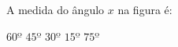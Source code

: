 A medida do \^angulo $x$ na figura \'e:

\parbox{0.25\linewidth}{

$60º$
$45º$
$30º$
$15º$
$75º$

}\parbox{0.74\linewidth}{
\begin{center}
\vspace{-6mm}
\vspace{-9mm}
\end{center}
}



